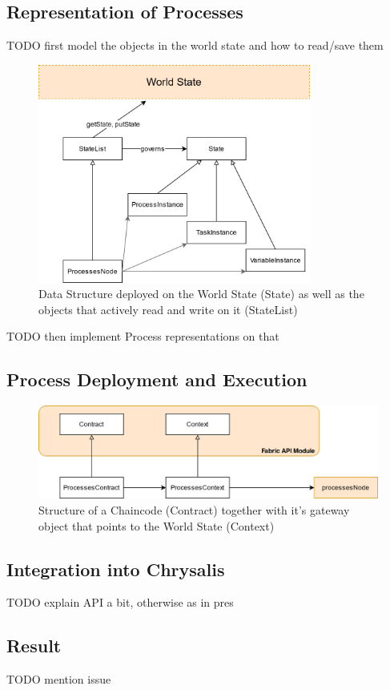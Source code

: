 \subsection{Representation of Processes}
\label{sec:impr:hl:datastructure}

TODO first model the objects in the world state and how to read/save them

\begin{figure}[h]
	\centering
	\captionsetup{justification=centering,margin=2cm}
	\includegraphics[width=0.8\textwidth]{gfx/hl-data}
	\caption{Data Structure deployed on the World State (State) as well as the objects that actively read and write on it (StateList)}
	\label{fig:impr:hl:data}
\end{figure}

TODO then implement Process representations on that

\subsection{Process Deployment and Execution}
\label{sec:impr:hl:chaincode}

\begin{figure}[h]
	\centering
	\captionsetup{justification=centering,margin=2cm}
	\includegraphics[width=\textwidth]{gfx/hl-contract}
	\caption{Structure of a Chaincode (Contract) together with it's gateway object that points to the World State (Context)}
	\label{fig:impr:hl:contract}
\end{figure}

\subsection{Integration into Chrysalis}
\label{sec:impr:hl:integration}

TODO explain API a bit, otherwise as in pres

\subsection{Result}
\label{sec:impr:hl:result}

TODO mention issue